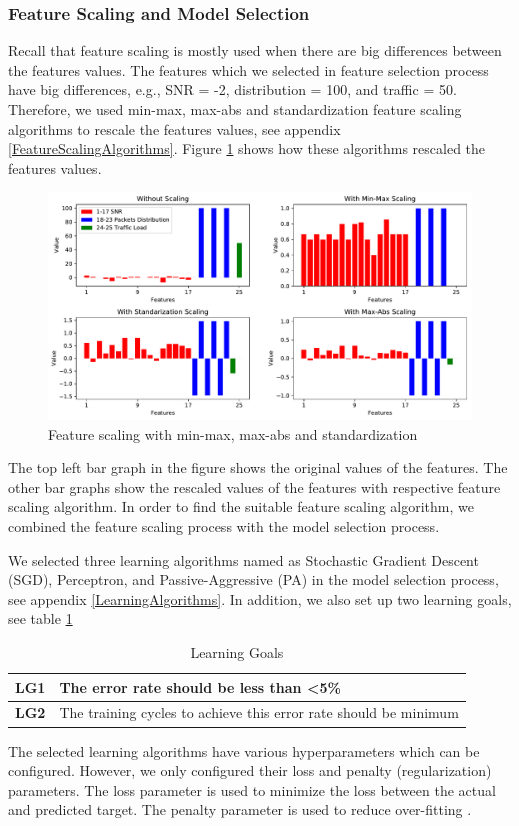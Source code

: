 \documentclass[a4paper,12pt]{article}
\begin{document}
\subsubsection{Feature Scaling and Model Selection} \label{FeatureScalingAndModelSelection}
Recall that feature scaling is mostly used when there are big differences between the features values. The features which we selected in feature selection process have big differences, e.g., SNR = -2, distribution = 100, and traffic = 50. Therefore, we used min-max, max-abs and standardization feature scaling algorithms to rescale the features values, see appendix \ref{FeatureScalingAlgorithms}. Figure \ref{FeatureScaling} shows how these algorithms rescaled the features values.
\begin{figure}[H]
	\centering
	\includegraphics[keepaspectratio, width=\linewidth]{graphs/FeatureScaling.pdf}
	\caption{Feature scaling with min-max, max-abs and standardization}
	\label{FeatureScaling}
\end{figure}
The top left bar graph in the figure shows the original values of the features. The other bar graphs show the rescaled values of the features with respective feature scaling algorithm. In order to find the suitable feature scaling algorithm, we combined the feature scaling process with the model selection process.

We selected three learning algorithms named as Stochastic Gradient Descent (SGD), Perceptron, and Passive-Aggressive (PA) in the model selection process, see appendix \ref{LearningAlgorithms}. In addition, we also set up two learning goals, see table \ref{LearningGoals}
\begin{table}[H]
	\centering
	\begin{tabular}{|p{1cm}|p{11cm}|}
		\hline
		\textbf{LG1} & The error rate should be less than <5\% \\
		\hline
		\textbf{LG2} & The training cycles to achieve this error rate should be minimum \\
		\hline
	\end{tabular}
	\caption{Learning Goals}
	\label{LearningGoals}
\end{table}
The selected learning algorithms have various hyperparameters which can be configured. However, we only configured their loss and penalty (regularization) parameters. The loss parameter is used to minimize the loss between the actual and predicted target. The penalty parameter is used to reduce over-fitting \cite{MMLWSL-2014}.
\end{document}
